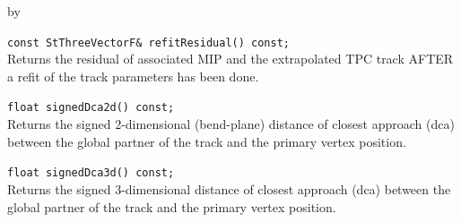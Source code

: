 \documentclass[twoside]{article}
\newcommand{\entrylabel}[1]{\mbox{\textbf{{#1}}}\hfil}%
\newenvironment{entry}
{\begin{list}{}%
    {\renewcommand{\makelabel}{\entrylabel}%
     \setlength{\labelwidth}{90pt}%
     \setlength{\leftmargin}{\labelwidth}
     \advance\leftmargin by \labelsep%
      }%
    }%
  {\end{list}}
\newcommand{\Entrylabel}[1]%
{\raisebox{0pt}[1ex][0pt]{\makebox[\labelwidth][l]%
    {\parbox[t]{\labelwidth}{\hspace{0pt}\textbf{{#1}}}}}}
\newenvironment{Entry}%
{\renewcommand{\entrylabel}{\Entrylabel}\begin{entry}}%
  {\end{entry}}
\begin{document}
\begin{Entry}
    \verb+const StThreeVectorF& refitResidual() const;+\\
    Returns the residual of associated MIP and the
    extrapolated TPC track AFTER a refit of the track
    parameters has been done.

    \verb+float signedDca2d() const;+\\
    Returns the signed 2-dimensional (bend-plane)
    distance of closest approach (dca) between the
    global partner of the track and the primary vertex
    position.
    
    \verb+float signedDca3d() const;+\\
    Returns the signed 3-dimensional
    distance of closest approach (dca) between the
    global partner of the track and the primary vertex
    position.
\end{Entry}
\clearpage
\end{document}
